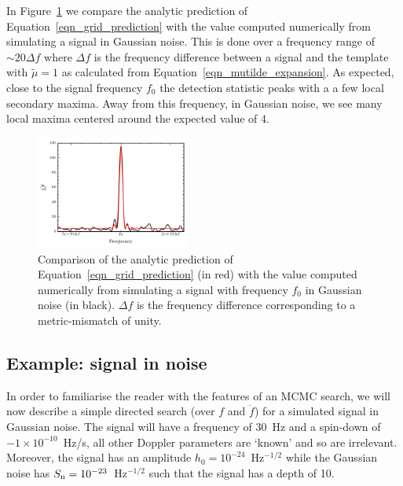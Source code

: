 \documentclass[aps, prd, twocolumn, superscriptaddress, floatfix, showpacs, nofootinbib, longbibliography]{revtex4-1}
\begin{document}
In Figure~\ref{fig_grid_frequency} we compare the analytic prediction of
Equation~\eqref{eqn_grid_prediction} with the value computed numerically from
simulating a signal in Gaussian noise. This is done over a frequency range of
$\sim20\Delta f$ where $\Delta f$ is the frequency difference between a signal
and the template with $\tilde{\mu}=1$ as calculated from
Equation~\eqref{eqn_mutilde_expansion}. As expected, close to the signal
frequency $f_0$ the detection statistic peaks with a a few local secondary
maxima. Away from this frequency, in Gaussian noise, we see many local maxima
centered around the expected value of 4.
\begin{figure}[htb]
\centering \includegraphics[width=0.45\textwidth]{grided_frequency_search_1D}
\caption{Comparison of the analytic prediction of
Equation~\eqref{eqn_grid_prediction} (in red) with the value computed
numerically from simulating a signal with frequency $f_0$ in Gaussian noise (in
black). $\Delta f$ is the frequency difference corresponding to a
metric-mismatch of unity.}
\label{fig_grid_frequency}
\end{figure}

\subsection{Example: signal in noise}

In order to familiarise the reader with the features of an MCMC search, we will
now describe a simple directed search (over $f$ and $\dot{f}$) for a simulated
signal in Gaussian noise. The signal will have a frequency of $30$~Hz and a
spin-down of $-1{\times}10^{-10}$~Hz/s, all other Doppler parameters are
`known' and so are irrelevant. Moreover, the signal has an amplitude
$h_0=10^{-24}$~Hz$^{-1/2}$ while the Gaussian noise has
$S_{\rm n}=10^{-23}$~Hz$^{-1/2}$ such that the signal has a depth of 10.
\end{document}
